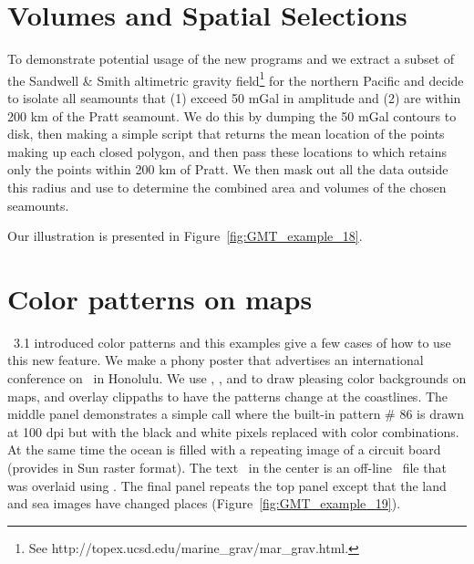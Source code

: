 

\section{Volumes and Spatial Selections}

To demonstrate potential usage of the new programs
 and  we extract a subset
of the Sandwell \& Smith altimetric gravity field\footnote{
See http://topex.ucsd.edu/marine\_grav/mar\_grav.html.}
for the northern Pacific and decide to isolate all seamounts that
(1) exceed 50 mGal in amplitude and (2) are within 200 km
of the Pratt seamount.  We do this by dumping the 50 mGal
contours to disk, then making a simple  script
 that returns the mean location of the points
making up each closed polygon, and then pass these locations
to  which retains only the points within 200
km of Pratt.  We then mask out all the data outside this
radius and use  to determine the combined
area and volumes of the chosen seamounts.


Our illustration is presented in Figure~\ref{fig:GMT_example_18}.



\section{Color patterns on maps}

\GMT\ 3.1 introduced color patterns and this examples give
a few cases of how to use this new feature.  We make a phony
poster that advertises an international conference on \GMT\
in Honolulu.  We use , , and
 to draw pleasing color backgrounds on maps,
and overlay  clippaths to have the patterns
change at the coastlines.  The middle panel demonstrates a
simple \GMTprog{pscoast} call where the built-in pattern \# 86
is drawn at 100 dpi but with the black and white pixels
replaced with color combinations. At the same time the ocean is filled with a repeating
image of a circuit board (provides in Sun raster format).
The text \GMT\ in the center is an off-line \PS\ file that was overlaid using .
The final panel repeats the top panel except that the land and sea images have changed places
(Figure~\ref{fig:GMT_example_19}).


